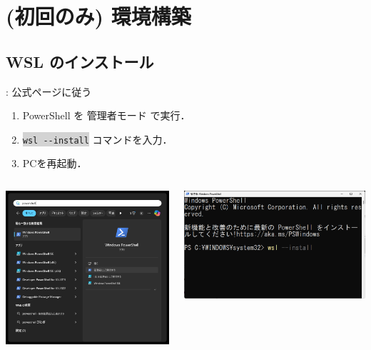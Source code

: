\documentclass[aspectratio=169,dvipdfmx,cjk]{beamer}
\newcommand{\cmdline}[1]{
    \colorbox{lightgray}{\lstinline[style=command]{#1}}
}
\newcommand{\blue}[1]{ {\color{blue} #1} }
\begin{document}
\section{(初回のみ) 環境構築}

\subsection{WSL のインストール}
\begin{frame}{\insertsection \thesubsection: \insertsubsection}
  公式ページ\cite{WSL}に従う
  \begin{enumerate}
    \item PowerShell を\blue{管理者モード}で実行．
    \item \cmdline{wsl --install} コマンドを入力．
    \item PCを再起動．
  \end{enumerate}
  \begin{columns}
    \begin{column}{0.35\textwidth}
        \includegraphics[width=1.0\linewidth]{fig/powershell.png}
    \end{column}
    \begin{column}{0.55\textwidth}
      \includegraphics[width=1.0\linewidth]{fig/wsl-install.png}

\end{column}
\end{columns}
\end{frame}
\end{document}
